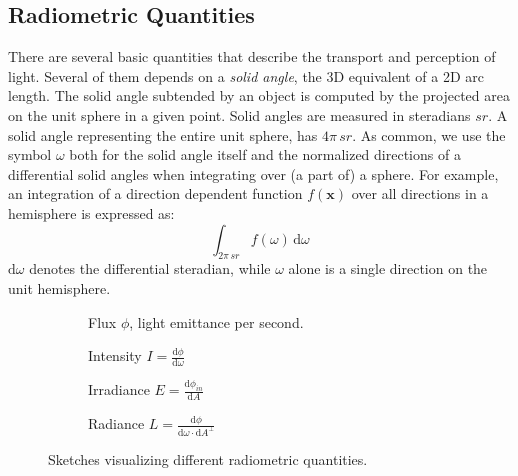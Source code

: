 \documentclass[thesis.tex]{subfiles}
\begin{document}
\subsection{Radiometric Quantities}
There are several basic quantities that describe the transport and perception of light.
Several of them depends on a \emph{solid angle}, the 3D equivalent of a 2D arc length.
The solid angle subtended by an object is computed by the projected area on the unit sphere in a given point.
Solid angles are measured in steradians $sr$.
A solid angle representing the entire unit sphere, has $4\pi\,sr$.
As common, we use the symbol $\omega$ both for the solid angle itself and the normalized directions of a differential solid angles when integrating over (a part of) a sphere.
For example, an integration of a direction dependent function $f(\mathbf{x})$ over all directions in a hemisphere is expressed as:
\begin{equation}
\int_{2\pi\,sr} f(\omega) \, \mathrm{d}\omega
\end{equation} 
$\mathrm{d}\omega$ denotes the differential steradian, while $\omega$ alone is a single direction on the unit hemisphere.

\begin{figure}[h]
\centering
\begin{subfigure}[b]{0.45\textwidth}
\centering
{}
\caption{Flux $\phi$, light emittance per second.}
\label{fig:flux}
\end{subfigure}
\begin{subfigure}[b]{0.45\textwidth}
\centering
{}
\caption{Intensity $I = \frac{\mathrm{d}\phi}{\mathrm{d}\omega}$}
\label{fig:intensity}
\end{subfigure}

\vspace{10pt}

\begin{subfigure}[b]{0.45\textwidth}
\centering
{}
\caption{Irradiance $E = \frac{\mathrm{d}\phi_{in}}{\mathrm{d}A}$}
\label{fig:irradiance}
\end{subfigure}
\begin{subfigure}[b]{0.45\textwidth}
\centering
{}
\caption{Radiance $L = \frac{\mathrm{d}\phi}{\mathrm{d}\omega \cdot \mathrm{d}A^\perp }$}
\label{fig:radiance}
\end{subfigure}
\caption{Sketches visualizing different radiometric quantities.}
\end{figure}
\end{document}
